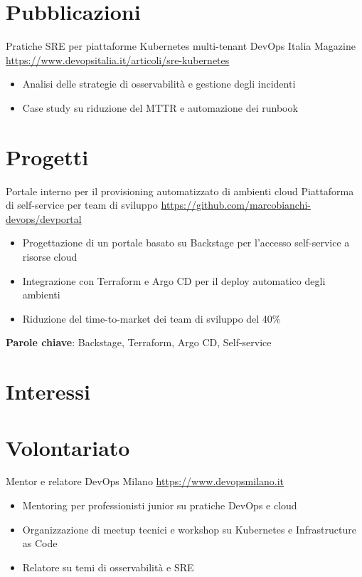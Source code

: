 \documentclass[a4paper, serif, 10pt]{moderncv}
\begin{document}
\section{Pubblicazioni}

        {Pratiche SRE per piattaforme Kubernetes multi-tenant}
        {DevOps Italia Magazine}
        {\url{https://www.devopsitalia.it/articoli/sre-kubernetes}}
        {}
        {\begin{itemize}
\item Analisi delle strategie di osservabilità e gestione degli incidenti
\item Case study su riduzione del MTTR e automazione dei runbook
\end{itemize}}
\section{Progetti}

        {Portale interno per il provisioning automatizzato di ambienti cloud}
        {Piattaforma di self-service per team di sviluppo}
        {\url{https://github.com/marcobianchi-devops/devportal}}
        {}
        {\begin{itemize}
\item Progettazione di un portale basato su Backstage per l'accesso self-service a risorse cloud
\item Integrazione con Terraform e Argo CD per il deploy automatico degli ambienti
\item Riduzione del time-to-market dei team di sviluppo del 40\%
\end{itemize}
\textbf{Parole chiave}: Backstage, Terraform, Argo CD, Self-service}
\section{Interessi}

\section{Volontariato}

        {Mentor e relatore}
        {DevOps Milano}
        {\url{https://www.devopsmilano.it}}
        {}
        {\begin{itemize}
\item Mentoring per professionisti junior su pratiche DevOps e cloud
\item Organizzazione di meetup tecnici e workshop su Kubernetes e Infrastructure as Code
\item Relatore su temi di osservabilità e SRE
\end{itemize}}
    
\end{document}
